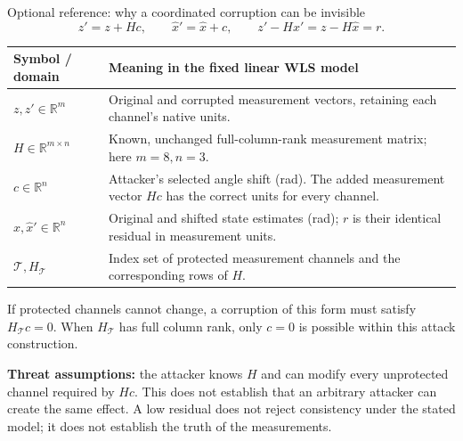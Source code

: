 \begin{frame}[t]{Optional reference: why a coordinated corruption can be invisible}
\[
z'=z+Hc,\qquad \hat x'=\hat x+c,\qquad z'-H\hat x'=z-H\hat x=r.
\]
\begin{tabular}{@{}>{\raggedright\arraybackslash}p{.25\linewidth}>{\raggedright\arraybackslash}p{.68\linewidth}@{}}
\toprule Symbol / domain & Meaning in the fixed linear WLS model \\
\midrule
$z,z'\in\mathbb R^m$ & Original and corrupted measurement vectors, retaining each channel's native units. \\
$H\in\mathbb R^{m\times n}$ & Known, unchanged full-column-rank measurement matrix; here $m=8,n=3$. \\
$c\in\mathbb R^n$ & Attacker's selected angle shift (rad). The added measurement vector $Hc$ has the correct units for every channel. \\
$\hat x,\hat x'\in\mathbb R^n$ & Original and shifted state estimates (rad); $r$ is their identical residual in measurement units. \\
$\mathcal T,H_{\mathcal T}$ & Index set of protected measurement channels and the corresponding rows of $H$. \\
\bottomrule
\end{tabular}
\par\medskip If protected channels cannot change, a corruption of this form must satisfy $H_{\mathcal T}c=0$. When $H_{\mathcal T}$ has full column rank, only $c=0$ is possible within this attack construction.
\par\medskip\textbf{Threat assumptions:} the attacker knows $H$ and can modify every unprotected channel required by $Hc$. This does not establish that an arbitrary attacker can create the same effect. A low residual does not reject consistency under the stated model; it does not establish the truth of the measurements.
\end{frame}

